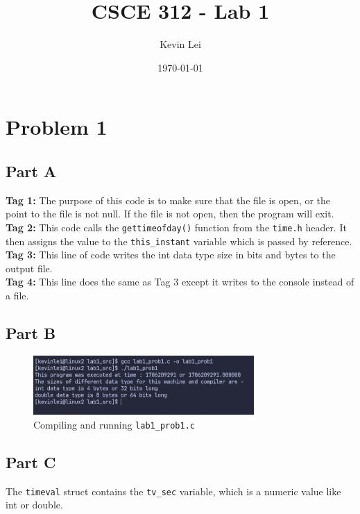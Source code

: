 \documentclass{article}
\title{CSCE 312 - Lab 1}
\author{Kevin Lei}
\date{\today}
\begin{document}
\maketitle

\section{Problem 1}

\subsection{Part A}
\textbf{Tag 1: } The purpose of this code is to make sure that the file is open, or the point to the file is not null. 
If the file is not open, then the program will exit.\\
\textbf{Tag 2: } This code calls the \lstinline!gettimeofday()! function from the \lstinline!time.h! header.
It then assigns the value to the \lstinline!this_instant! variable which is passed by reference. \\
\textbf{Tag 3: } This line of code writes the int data type size in bits and bytes to the output file. \\
\textbf{Tag 4: } This line does the same as Tag 3 except it writes to the console instead of a file. \\

\subsection{Part B}
\begin{figure}[H]
    \centering
    \includegraphics[width=0.75\textwidth]{./images/prob1partb.png}
    \caption{Compiling and running \lstinline!lab1_prob1.c!}
\end{figure}

\subsection{Part C}
The \lstinline!timeval! struct contains the \lstinline!tv_sec! variable, which is a numeric value like int or double.
\end{document}
